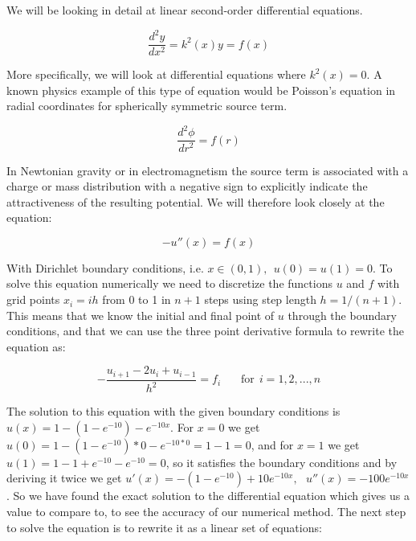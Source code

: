 \documentclass[a4paper,11pt]{article}
\begin{document}
{We will be looking in detail at linear second-order differential equations.

$$\frac{d^2y}{dx^2} = k^2(x) y = f(x)$$

More specifically, we will look at differential equations where $k^2(x) = 0$. A known physics example of this type of equation would be Poisson's equation in radial coordinates for spherically symmetric source term.

$$\frac{d^2 \phi}{d r^2} = f(r)$$

In Newtonian gravity or in electromagnetism the source term is associated with a charge or mass distribution with a negative sign to explicitly indicate the attractiveness of the resulting potential. We will therefore look closely at the equation:

\begin{equation}
	- u''(x) = f(x)
	\label{diff_eq}
\end{equation}

With Dirichlet boundary conditions, i.e. $ x \in (0,1), \: \: u(0) = u(1) = 0$. To solve this equation numerically we need to discretize the functions $u$ and $f$ with grid points $x_i = i h$ from 0 to 1 in $n+1$ steps using step length $h = 1/(n+1)$. This means that we know the initial and final point of $u$ through the boundary conditions, and that we can use the three point derivative formula to rewrite the equation as:

\begin{equation}
- \frac{u_{i+1} - 2u_i + u_{i-1}}{h^2} = f_i \: \: \: \: \: \: \: \: \text{for} \: \: i = 1, 2, ... , n
\label{disc_diff_eq}
\end{equation}

The solution to this equation with the given boundary conditions is $u(x) = 1 - (1-e^{-10}) - e^{-10x}$. For $x = 0$ we get $u(0) = 1 - (1 - e^{-10})*0 - e^{-10 * 0} = 1-1 = 0$, and for $x = 1$ we get $u(1) = 1 - 1 + e^{-10} - e^{-10} = 0$, so it satisfies the boundary conditions and by deriving it twice we get $u'(x) = -(1-e^{-10}) + 10e^{-10x}, \: \: \: u''(x) = -100 e^{-10x}$. So we have found the exact solution to the differential equation which gives us a value to compare to, to see the accuracy of our numerical method. The next step to solve the equation is to rewrite it as a linear set of equations:

}
\end{document}
